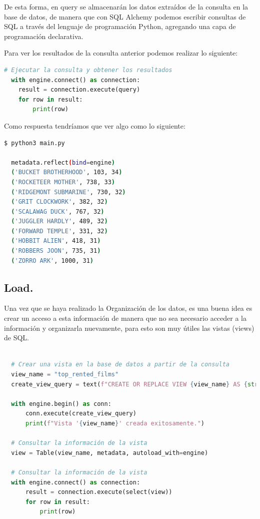 \documentclass[12pt]{article}
\begin{document}
De esta forma, en query se almacenarán los datos extraídos de la consulta en la base de datos, de manera que con SQL Alchemy podemos escribir consultas de SQL a través del lenguaje de programación Python, agregando una capa de programación declarativa.
\vspace{12pt}

Para ver los resultados de la consulta anterior podemos realizar lo siguiente:

\vspace{12pt}
\begin{lstlisting}[language=Python]
  # Ejecutar la consulta y obtener los resultados
  with engine.connect() as connection:
    result = connection.execute(query)
    for row in result:
        print(row)
\end{lstlisting}
\vspace{12pt}

Como respuesta tendríamos que ver algo como lo siguiente:

\vspace{12pt}
\begin{lstlisting}[language=Bash]
  $ python3 main.py 

  metadata.reflect(bind=engine)
  ('BUCKET BROTHERHOOD', 103, 34)
  ('ROCKETEER MOTHER', 738, 33)
  ('RIDGEMONT SUBMARINE', 730, 32)
  ('GRIT CLOCKWORK', 382, 32)
  ('SCALAWAG DUCK', 767, 32)
  ('JUGGLER HARDLY', 489, 32)
  ('FORWARD TEMPLE', 331, 32)
  ('HOBBIT ALIEN', 418, 31)
  ('ROBBERS JOON', 735, 31)
  ('ZORRO ARK', 1000, 31)
\end{lstlisting}
\vspace{12pt}

\subsection{Load.}

Una vez que se haya realizado la Organización de los datos, es una buena idea es crear un acceso a esta información de manera que no sea necesario acceder a la información y organizarla nuevamente, para esto son muy útiles las vistas (views) de SQL.

\vspace{12pt}
\begin{lstlisting}[language=Python]
    
  # Crear una vista en la base de datos a partir de la consulta
  view_name = "top_rented_films"
  create_view_query = text(f"CREATE OR REPLACE VIEW {view_name} AS {str(query.compile(engine, compile_kwargs={'literal_binds': True}))}")
  
  with engine.begin() as conn:
      conn.execute(create_view_query)
      print(f"Vista '{view_name}' creada exitosamente.")
  
  # Consultar la información de la vista
  view = Table(view_name, metadata, autoload_with=engine)
  
  # Consultar la información de la vista
  with engine.connect() as connection:
      result = connection.execute(select(view))
      for row in result:
          print(row)
    
\end{lstlisting}
\vspace{12pt}
\end{document}
